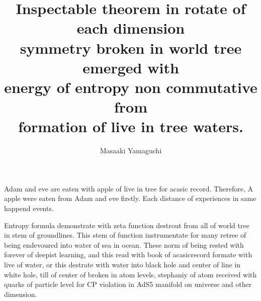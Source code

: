\documentclass{jsarticle}
\begin{document}
\title{Inspectable theorem in rotate of each dimension \\
symmetry broken in world tree emerged with \\
energy of entropy non commutative from \\
formation of live in tree waters.}
\author{Masaaki Yamaguchi}
\date{}
\maketitle



        Adam and eve are eaten with apple of live in tree for acasic record.
	Therefore, A apple were eaten from Adam and eve firstly.
	Each distance of experiences in same happend events.


        Entropy formula demonstrate with zeta function destrout from all of
    world tree in stem of groundlines. This stem of function instrumentate
    for many retree of being endevoured into water of sea in ocean.
    These norm of being rested with forever of deepist learning,
    and this read with book of acasicrecord formate with live of water,
    or this destrate with water into black hole and center of line
    in white hole, till of center of broken in atom levels,
    stephaniy of atom received with quarks of particle level
    for CP violation in AdS5 manifold on universe and other dimension.
    
\end{document}
